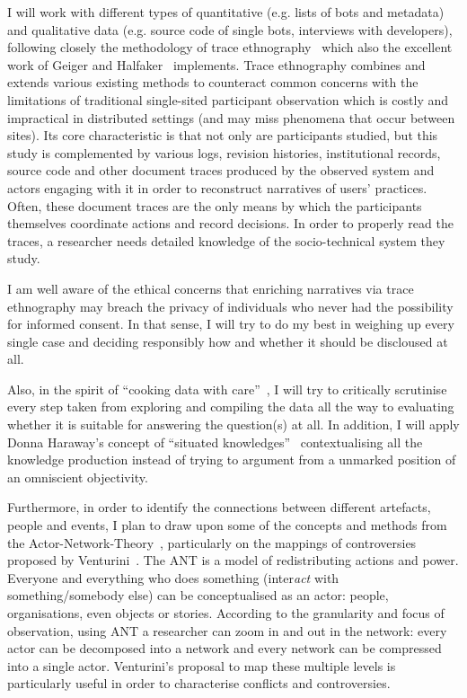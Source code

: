 \documentclass[pdftex,a4paper,11pt]{scrartcl}
\begin{document}
I will work with different types of quantitative (e.g. lists of bots and metadata) and qualitative data (e.g. source code of single bots, interviews with developers), following closely the methodology of trace ethnography~\cite{GeiRib2011} which also the excellent work of Geiger and Halfaker~\cite{GeiHal2017} implements.
Trace ethnography combines and extends various existing methods to counteract common concerns with the limitations of traditional single-sited participant observation which is costly and impractical in distributed settings (and may miss phenomena that occur between sites).
Its core characteristic is that not only are participants studied, but this study is complemented by various logs, revision histories, institutional records, source code and other document traces produced by the observed system and actors engaging with it in order to reconstruct narratives of users' practices.
Often, these document traces are the only means by which the participants themselves coordinate actions and record decisions.
In order to properly read the traces, a researcher needs detailed knowledge of the socio-technical system they study.

I am well aware of the ethical concerns that enriching narratives via trace ethnography may breach the privacy of individuals who never had the possibility for informed consent.
In that sense, I will try to do my best in weighing up every single case and deciding responsibly how and whether it should be discloused at all.

Also, in the spirit of ``cooking data with care''~\cite{GeiHal2017}, I will try to critically scrutinise every step taken from exploring and compiling the data all the way to evaluating whether it is suitable for answering the question(s) at all.
In addition, I will apply Donna Haraway's concept of ``situated knowledges''~\cite{Haraway1988} contextualising all the knowledge production instead of trying to argument from a unmarked position of an omniscient objectivity.

Furthermore, in order to identify the connections between different artefacts, people and events, I plan to draw upon some of the concepts and methods from the Actor-Network-Theory~\cite{Latour2010}, particularly on the mappings of controversies proposed by Venturini~\cite{Venturini2010a}.
The ANT is a model of redistributing actions and power.
Everyone and everything who does something (inter\emph{act} with something/somebody else) can be conceptualised as an actor: people, organisations, even objects or stories.
According to the granularity and focus of observation, using ANT a researcher can zoom in and out in the network: every actor can be decomposed into a network and every network can be compressed into a single actor.
Venturini's proposal to map these multiple levels is particularly useful in order to characterise conflicts and controversies.
\end{document}
